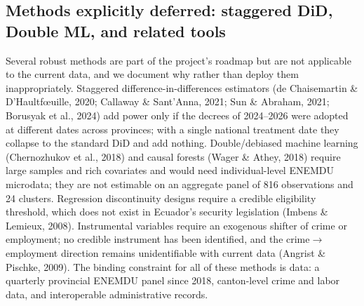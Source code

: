 \subsection{Methods explicitly deferred: staggered DiD, Double ML, and related tools}



Several robust methods are part of the project's roadmap but are not applicable to the current data, and we document why rather than deploy them inappropriately. Staggered difference-in-differences estimators (de Chaisemartin \& D'Haultf{\oe}uille, 2020; Callaway \& Sant'Anna, 2021; Sun \& Abraham, 2021; Borusyak et al., 2024) add power only if the decrees of 2024--2026 were adopted at different dates across provinces; with a single national treatment date they collapse to the standard DiD and add nothing. Double/debiased machine learning (Chernozhukov et al., 2018) and causal forests (Wager \& Athey, 2018) require large samples and rich covariates and would need individual-level ENEMDU microdata; they are not estimable on an aggregate panel of 816 observations and 24 clusters. Regression discontinuity designs require a credible eligibility threshold, which does not exist in Ecuador's security legislation (Imbens \& Lemieux, 2008). Instrumental variables require an exogenous shifter of crime or employment; no credible instrument has been identified, and the crime$\rightarrow$employment direction remains unidentifiable with current data (Angrist \& Pischke, 2009). The binding constraint for all of these methods is data: a quarterly provincial ENEMDU panel since 2018, canton-level crime and labor data, and interoperable administrative records.